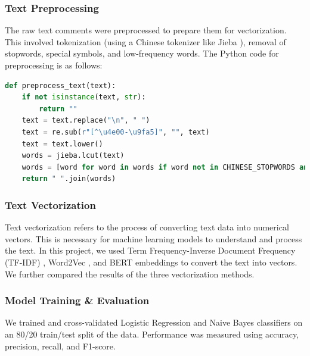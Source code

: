 \documentclass{article}
\begin{document}
\subsubsection{Text Preprocessing}
\label{sssec:preprocessing}
The raw text comments were preprocessed to prepare them for vectorization. 
This involved tokenization (using a Chinese tokenizer like Jieba \cite{Jieba2012}), removal of stopwords, special symbols, 
and low-frequency words.
The Python code for preprocessing is as follows:
\begin{lstlisting}[language=Python]
def preprocess_text(text):
    if not isinstance(text, str):
        return ""
    text = text.replace("\n", " ")
    text = re.sub(r"[^\u4e00-\u9fa5]", "", text)
    text = text.lower()
    words = jieba.lcut(text)
    words = [word for word in words if word not in CHINESE_STOPWORDS and len(word) > 1]
    return " ".join(words)
\end{lstlisting}

\subsubsection{Text Vectorization}
\label{sssec:vectorization}
Text vectorization refers to the process of converting text data into numerical vectors. 
This is necessary for machine learning models to understand and process the text. 
In this project, we used Term Frequency-Inverse Document Frequency (TF-IDF) \cite{SparckJones1972} , Word2Vec \cite{Mikolov2013}, 
and BERT embeddings \cite{Devlin2019}
to convert the text into vectors. We further compared the results of the three vectorization methods.


\subsubsection{Model Training \& Evaluation}
\label{sssec:ml_training}
We trained and cross-validated Logistic Regression \cite{Cox1958} and Naive Bayes classifiers \cite{Bishop2006} on an 80/20 train/test 
split of the data. Performance was measured using accuracy, precision, recall, and F1-score.
\end{document}
